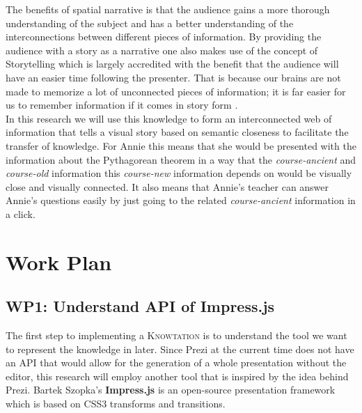\documentclass[twoside]{article}
\newcommand{\sys}{\textsc{Knowtation}\xspace}
\begin{document}
The benefits of spatial narrative is that the audience gains a more thorough understanding of the subject and has a better understanding of the interconnections between different pieces of information. By providing the audience with a story as a narrative one also makes use of the concept of Storytelling which is largely accredited with the benefit that the audience will have an easier time following the presenter. That is because our brains are not made to memorize a lot of unconnected pieces of information; it is far easier for us to remember information if it comes in story form .\\

In this research we will use this knowledge to form an interconnected web of information that tells a visual story based on semantic closeness to facilitate the transfer of knowledge. For Annie this means that she would be presented with the information about the Pythagorean theorem in a way that the \textit{course-ancient} and \textit{course-old} information this \textit{course-new} information depends on would be visually close and visually connected. It also means that Annie's teacher can answer Annie's questions easily by just going to the related \textit{course-ancient} information in a click.\\

\section{Work Plan}
\subsection{WP1: Understand API of Impress.js}
The first step to implementing a \sys {} is to understand the tool we want to represent the knowledge in later. Since Prezi at the current time does not have an API that would allow for the generation of a whole presentation without the editor, this research will employ another tool that is inspired by the idea behind Prezi. Bartek Szopka's \textbf{Impress.js} \cite{JSImpress:npentrel14} is an open-source presentation framework which is based on CSS3 transforms and transitions. \\
\end{document}
